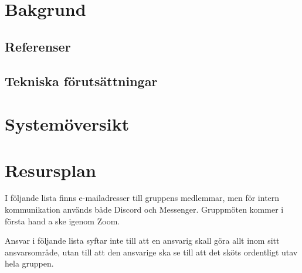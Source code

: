 \documentclass{article}
\begin{document}
\section{Bakgrund}

\subsection{Referenser}

\subsection{Tekniska förutsättningar}

\section{Systemöversikt}

\section{Resursplan}

I följande lista finns e-mailadresser till gruppens medlemmar, men för intern kommunikation används både Discord och Messenger. Gruppmöten kommer i första hand a ske igenom Zoom.

Ansvar i följande lista syftar inte till att en ansvarig skall göra allt inom sitt ansvarsområde, utan till att den ansvarige ska se till att det sköts ordentligt utav hela gruppen.
\end{document}
